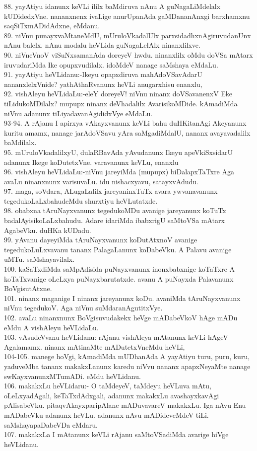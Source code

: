 \documentclass{article}
\begin{document}
88. yayAtiyu idanunx keVLi ililx baMdiruva nAnu A guNagaLiMdelalx kUDidedxVne. nananxnenx ivaLige anurUpanAda gaMDananAnxgi barxhamxnu saqSiTxmADidAdxne, eMdanu.\\
89. niVnu punayxvaMtaneMdU, mUruloVkadalUlx parxsidadhxnAgiruvudanUnx nAnu balelx. nAnu modalu heVLida guNagaLelAlx ninanxlilxve.\\
90. niVneVnoV viSuNxsamanAda doreyeV hwdu. ninanxlilx oMdu doVSa mAtarx iruvudariMda Ike opupxvudilalx. idoMdeV nanage saMshaya eMdaLu.\\
91. yayAtiyu heVLidanu:-Ikeyu opapxdiruva mahAdoVSavAdarU nananxlelxVnide? yathAthaRvanunx heVLi anugarxhisu enanxlu,\\
92. vishAleyu heVLidaLu:-eleY doreyeV! niVnu ninanx doVSavanenxV Eke tiLidukoMDilalx? mupupx ninanx deVhadalilx AvarisikoMDide. kAmadiMda niVnu adanunx tiLiyadavanAgididxVye eMdaLu.\\
93-94. A rAjanu I apirxya vAkayxvanunx keVLi bahu duHKitanAgi Akeyanunx kuritu amamx, nanage jarAdoVSavu yAra saMgadiMdalU, nananx avayavadalilx baMdilalx.\\
95. mUruloVkadalilxyU, dulaRBavAda yAvudanunx Ikeyu apeVkiSxsidarU adanunx Ikege koDutetxVne. varavanunx keVLu, enanxlu\\
96. vishAleyu heVLidaLu:-niVnu jareyiMda (mupupx) biDalapxTaTxre Aga avaLu ninanxnunx varisuvaLu. idu nishacxyavu, satayxvAdudu.\\
97. maga, soVdara, ALugaLalilx jareyaninxTuTx avara ywvanavanunx tegedukoLaLxbahudeMdu shurxtiyu heVLutatxde.\\
98. obabxna tAruNayxvanunx tegedukoMDu avanige jareyanunx koTuTx badalAyisikoLaLxbahudu. Adare idariMda ibabxrigU saMtoVSa mAtarx AgabeVku. duHKa kUDadu.\\
99. yAvanu dayeyiMda tAruNayxvanunx koDutAtxnoV avanige tegedukoLuLxvavanu tananx PalagaLanunx koDabeVku. A Palavu avanige uMTu. saMshayavilalx.\\
100. kaSaTxdiMda saMpAdisida puNayxvanunx inonxbabxnige koTaTxre A koTaTxvanige oLeLxya puNayxbarutatxde. avanu A puNayxda Palavanunx BoVgisutAtxne.\\
101. ninanx maganige I ninanx jareyanunx koDu. avaniMda tAruNayxvanunx niVnu tegedukoV. Aga niVnu suMdaranAgutitxVye.\\
102. avaLu ninanxnunx BoVgisuvudakekx heVge mADabeVkoV hAge mADu eMdu A vishAleyu heVLidaLu.\\
103. vAsudeVvanu heVLidanu:-rAjanu vishAleya mAtanunx keVLi hAgeV Agalamamx. ninanx mAtinaMte mADutetxVneMdu heVLi,\\
104-105. manege hoVgi, kAmadiMda mUDhanAda A yayAtiyu turu, puru, kuru, yaduveMba tananx makakxLanunx karedu niVvu nananx apapxNeyaMte nanage swKayxvanunxMTumADi. eMdu heVLidanu.\\
106. makakxLu heVLidaru:- O taMdeyeV, taMdeyu heVLuva mAtu, oLeLxyadAgali, keTaTxdAdxgali, adanunx makakxLu avashayxkavAgi pAlisabeVku. pitaqvAkayxparipAlane mADuvavareV makakxLu. Iga nAvu Enu mADabeVku adanunx heVLu. adanunx nAvu mADideveMdeV tiLi. saMshayapaDabeVDa eMdaru.\\
107. makakxLa I mAtanunx keVLi rAjanu saMtoVSadiMda avarige hiVge heVLidanu.\\
\end{document}
